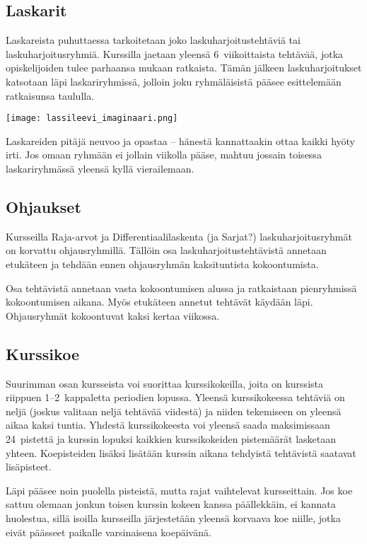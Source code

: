 \documentclass[../ala_hataile.tex]{subfiles}
\begin{document}
	\subsection*{Laskarit}
	Laskareista puhuttaessa tarkoitetaan
	joko laskuharjoitustehtäviä tai laskuharjoitusryhmiä.
	Kurssilla jaetaan yleensä 6~viikoittaista tehtävää, jotka opiskelijoiden
	tulee parhaansa mukaan ratkaista. Tämän
	jälkeen laskuharjoitukset katsotaan läpi
	laskariryhmissä, jolloin joku ryhmäläisistä
	pääsee esittelemään ratkaisunsa taululla.
	
	\begin{figure*}[!b]
		\texttt{[image: lassileevi\_imaginaari.png]}
	\end{figure*}
	Laskareiden pitäjä neuvoo ja opastaa -- hänestä
	kannattaakin ottaa kaikki hyöty irti.
	Jos omaan ryhmään ei jollain viikolla pääse,
	mahtuu jossain toisessa laskariryhmässä
	yleensä kyllä vierailemaan.
	\subsection*{Ohjaukset}
	Kursseilla Raja-arvot ja Differentiaalilaskenta (ja Sarjat?)
	laskuharjoitusryhmät
	on korvattu ohjausryhmillä.
	Tällöin osa laskuharjoitustehtävistä
	annetaan etukäteen ja tehdään ennen ohjausryhmän kaksituntista
	kokoontumista.
	
	Osa tehtävistä annetaan vasta kokoontumisen
	alussa ja ratkaistaan pienryhmissä
	kokoontumisen aikana. Myös etukäteen annetut
	tehtävät käydään läpi. Ohjausryhmät
	kokoontuvat kaksi kertaa viikossa.

	\subsection*{Kurssikoe}
	Suurimman osan kursseista voi suorittaa
	kurssikokeilla, joita on kurssista riippuen
	1--2~kappaletta periodien lopussa. Yleensä
	kurssikokeessa tehtäviä on neljä (joskus
	valitaan neljä tehtävää viidestä) ja niiden
	tekemiseen on yleensä aikaa kaksi tuntia.
	Yhdestä kurssikokeesta voi yleensä saada
	maksimissaan 24~pistettä ja kurssin lopuksi
	kaikkien kurssikokeiden pistemäärät lasketaan
	yhteen. Koepisteiden lisäksi lisätään
	kurssin aikana tehdyistä tehtävistä saatavat
	lisäpisteet.
	
	Läpi pääsee noin puolella pisteistä, mutta
	rajat vaihtelevat kursseittain. Jos koe sattuu
	olemaan jonkun toisen kurssin kokeen
	kanssa päällekkäin, ei kannata huolestua,
	sillä isoilla kursseilla järjestetään yleensä
	korvaava koe niille, jotka eivät päässeet
	paikalle varsinaisena koepäivänä.
	
\end{document}
